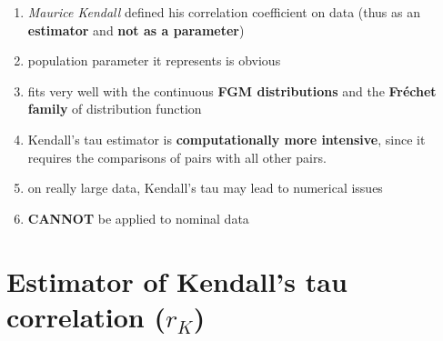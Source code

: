 \begin{enumerate}
    \item \textit{Maurice Kendall} defined his correlation coefficient on data (thus as an \textbf{estimator} and \textbf{not as a parameter})

    \item population parameter it represents is obvious

    \item fits very well with the continuous \textbf{FGM distributions} and the \textbf{Fréchet family} of distribution function
    
    \item Kendall’s tau estimator is \textbf{computationally more intensive}, since it requires the comparisons of pairs with all other pairs. 
    
    \item on really large data, Kendall’s tau may lead to numerical issues

    \item \textbf{CANNOT} be applied to nominal data

\end{enumerate}

\section{Estimator of Kendall’s tau correlation ($r_K$) \cite{ism-1}} \label{Multivariate Distributions: Estimator of Kendall’s tau correlation}

